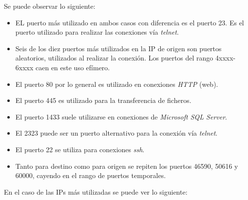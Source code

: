 Se puede observar lo siguiente:

\begin{itemize}
    \item EL puerto más utilizado en ambos casos con diferencia es el puerto 23. Es el puerto utilizado para realizar las conexiones vía \textit{telnet}.
    \item Seis de los diez puertos más utilizados en la IP de origen son puertos aleatorios, utilizados al realizar la conexión. Los puertos del rango 4xxxx-6xxxx caen en este uso efímero.
    \item El puerto 80 por lo general es utilizado en conexiones \textit{HTTP} (web).
    \item El puerto 445 es utilizado para la transferencia de ficheros.
    \item El puerto 1433 suele utilizarse en conexiones de \textit{Microsoft SQL Server}.
    \item El 2323 puede ser un puerto alternativo para la conexión vía \textit{telnet}\cite{telnetport}.
    \item El puerto 22 se utiliza para conexiones \textit{ssh}.
    \item Tanto para destino como para origen se repiten los puertos 46590, 50616 y 60000, cayendo en el rango de puertos temporales.
\end{itemize}

En el caso de las IPs más utilizadas se puede ver lo siguiente:

